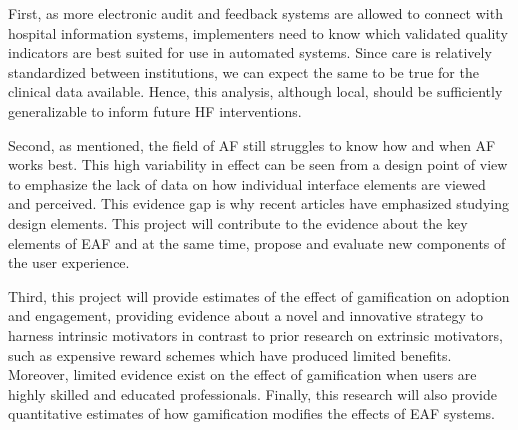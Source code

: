 First, as more electronic audit and feedback systems are allowed to connect with hospital information systems, implementers need to know which validated quality indicators are best suited for use in automated systems. Since care is relatively standardized between institutions, we can expect the same to be true for the clinical data available. Hence, this analysis, although local, should be sufficiently generalizable to inform future \gls{HF} interventions. 

Second, as mentioned, the field of \gls{AF} still struggles to know how and when \gls{AF} works best. This high variability in effect can be seen from a design point of view to emphasize the lack of data on how  individual interface elements are viewed and perceived. This evidence gap is why recent articles have emphasized studying design elements. This project will contribute to the evidence about the key elements of \gls{EAF} and at the same time, propose and evaluate new components of the user experience. 

Third, this project will provide estimates of the effect of gamification on adoption and engagement, providing evidence about a novel and innovative strategy to harness intrinsic motivators in contrast to prior research on extrinsic motivators, such as expensive reward schemes which have produced limited benefits. Moreover, limited evidence exist on the effect of gamification when users are highly skilled and educated professionals. Finally, this research will also provide quantitative estimates of how gamification modifies the effects of \gls{EAF} systems. 